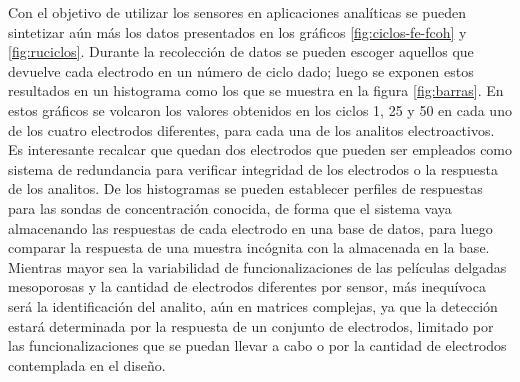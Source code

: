 	Con el objetivo de utilizar los sensores en aplicaciones analíticas se pueden sintetizar aún más los datos presentados en los gráficos \ref{fig:ciclos-fe-fcoh} y \ref{fig:ruciclos}. Durante la recolección de datos se pueden escoger aquellos que devuelve cada electrodo en un número de ciclo dado; luego se exponen estos resultados en un histograma como los que se muestra en la figura \ref{fig:barras}. En estos gráficos se volcaron los valores obtenidos en los ciclos 1, 25 y 50 en cada uno de los cuatro electrodos diferentes, para cada una de los analitos electroactivos. Es interesante recalcar que quedan dos electrodos que pueden ser empleados como sistema de redundancia para verificar integridad de los electrodos o la respuesta de los analitos. De los histogramas se pueden establecer perfiles de respuestas para las sondas de concentración conocida, de forma que el sistema vaya almacenando las respuestas de cada electrodo en una base de datos, para luego comparar la respuesta de una muestra incógnita con la almacenada en la base. Mientras mayor sea la variabilidad de funcionalizaciones de las películas delgadas mesoporosas y la cantidad de electrodos diferentes por sensor, más inequívoca será la identificación del analito, aún en matrices complejas, ya que la detección estará determinada por la respuesta de un conjunto de electrodos, limitado por las funcionalizaciones que se puedan llevar a cabo o por la cantidad de electrodos contemplada en el diseño.
   		

